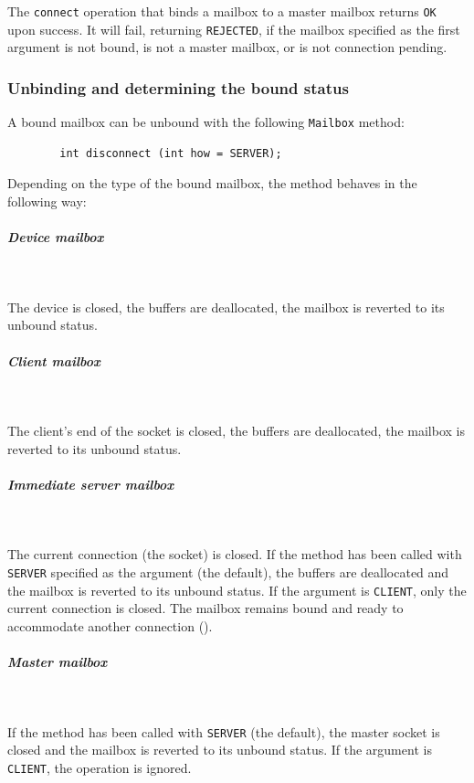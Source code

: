 \medskip

\noindent
The {\tt connect} operation that binds a mailbox to a master mailbox
returns {\tt OK} upon success.
It will fail, returning {\tt REJECTED}, if the mailbox specified as the
first argument is not bound, is not a master mailbox, or is not
connection pending.

\subsubsection{Unbinding and determining the bound status}
\label{rm_mb_bo_ub}

A bound mailbox can be unbound with the following {\tt Mailbox} method:
\begin{verbatim}
        int disconnect (int how = SERVER);
\end{verbatim}

Depending on the type of the bound mailbox, the method behaves in
the following way:

\subparagraph*{Device mailbox}\mbox{~}\vspace{0.1in}

\noindent
The device is closed, the buffers are deallocated, the mailbox is reverted
to its unbound status.

\subparagraph*{Client mailbox}\mbox{~}\vspace{0.1in}

\noindent
The client's end of the socket is closed, the buffers are deallocated,
the mailbox is reverted to its unbound status.

\subparagraph*{Immediate server mailbox}\mbox{~}\vspace{0.1in}

\noindent
The current connection (the socket) is closed.
If the method has been called with {\tt SERVER} specified as the argument
(the default),
the buffers are deallocated and the mailbox is reverted to its unbound
status.
If the argument is {\tt CLIENT}, only the current connection is closed.
The mailbox remains bound and ready
to accommodate another connection ().

\subparagraph*{Master mailbox}\mbox{~}\vspace{0.1in}

\noindent
If the method has been called with {\tt SERVER} (the default),
the master socket is closed and the mailbox is reverted to its
unbound status.
If the argument is {\tt CLIENT}, the operation is ignored.

\medskip

